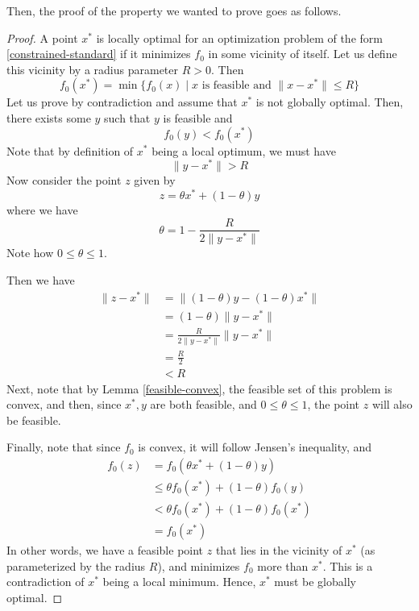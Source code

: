 \documentclass[a4paper]{article}
\theoremstyle{definition}
\begin{document}
Then, the proof of the property we wanted to prove goes as follows.
\begin{proof}
	A point $x^*$ is locally optimal for an optimization problem of the form \eqref{constrained-standard} if it minimizes $f_0$ in some vicinity of itself.
	Let us define this vicinity by a radius parameter $R > 0$.
	Then
	\begin{equation*}
		f_0(x^*) = \min \{ f_0(x) \mid x \text{ is feasible and } \| x - x^* \| \leq R \}
	\end{equation*}
	Let us prove by contradiction and assume that $x^*$ is not globally optimal.
	Then, there exists some $y$ such that $y$ is feasible and
	\begin{equation*}
		f_0(y) < f_0(x^*)
	\end{equation*}
	Note that by definition of $x^*$ being a local optimum, we must have
	\begin{equation*}
		\| y - x^* \| > R
	\end{equation*}
	Now consider the point $z$ given by
	\begin{equation*}
		z = \theta x^* + (1 - \theta) y
	\end{equation*}
	where we have
	\begin{equation*}
		\theta = 1 - \frac{R}{2 \| y - x^* \|}
	\end{equation*}
	Note how $0 \leq \theta \leq 1$.
	
	Then we have
	\begin{align*}
		\| z - x^* \| & = \| (1 - \theta) y - (1 - \theta) x^* \| \\
		& = (1 - \theta) \| y - x^* \| \\
		& = \frac{R}{2 \| y - x^* \|} \| y - x^* \| \\
		& = \frac{R}{2} \\
		& < R
	\end{align*}
	Next, note that by Lemma \ref{feasible-convex}, the feasible set of this problem is convex, and then, since $x^*, y$ are both feasible, and $0 \leq \theta \leq 1$, the point $z$ will also be feasible.

	Finally, note that since $f_0$ is convex, it will follow Jensen's inequality, and
	\begin{align*}
		f_0(z) & = f_0 (\theta x^* + (1 - \theta) y) \\
		& \leq \theta f_0 (x^*) + (1 - \theta) f_0(y) \\
		& < \theta f_0 (x^*) + (1 - \theta) f_0( x^* ) \\
		& = f_0 (x^*)
	\end{align*}
	In other words, we have a feasible point $z$ that lies in the vicinity of $x^*$ (as parameterized by the radius $R$), and minimizes $f_0$ more than $x^*$.
	This is a contradiction of $x^*$ being a local minimum.
	Hence, $x^*$ must be globally optimal.
\end{proof}
\end{document}
